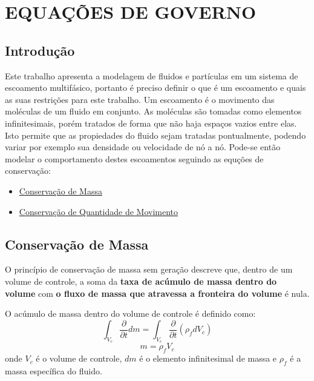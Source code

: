 \chapter{\textbf{EQUAÇÕES DE GOVERNO}}
\label{sec_eq_governo}
\section{\textbf{Introdução}}
Este trabalho apresenta a modelagem de fluidos e partículas em um sistema de escoamento multifásico, portanto é preciso definir o que é um escoamento e quais as suas restrições para este trabalho.
Um escoamento é o movimento das moléculas de um fluido em conjunto.
As moléculas são tomadas como elementos infinitesimais, porém tratados de forma que não haja espaços vazios entre elas.
Isto permite que as propiedades do fluido sejam tratadas pontualmente, podendo variar por exemplo sua densidade ou velocidade de nó a nó.
Pode-se então modelar o comportamento destes escoamentos seguindo as equções de conservação:
\begin{itemize}
	\item \hyperref[cons_massa]{Conservação de Massa}
	\item \hyperref[cons_qmov]{Conservação de Quantidade de Movimento}
\end{itemize}

\section{\textbf{Conservação de Massa}}
\label{sec_cons_massa}
O princípio de conservação de massa sem geração descreve que, dentro de um volume de controle, a soma da \textbf{taxa de acúmulo de massa dentro do volume} com \textbf{o fluxo de massa que atravessa a fronteira do volume} é nula\cite{pontes_norberto}.

O acúmulo de massa dentro do volume de controle é definido como:
\begin{equation}
    \int_{V_c}\dfrac{\partial}{\partial t} dm =  \int_{V_c}\dfrac{\partial}{\partial t} (\rho_f d V_c)
    \label{acumulo_massa}
\end{equation}
\begin{equation}
    m =  \rho_f V_c
    \label{densidade}
\end{equation}
onde $V_c$ é o volume de controle, $dm$ é o elemento infinitesimal de massa e $\rho_f$ é a massa específica do fluido.

